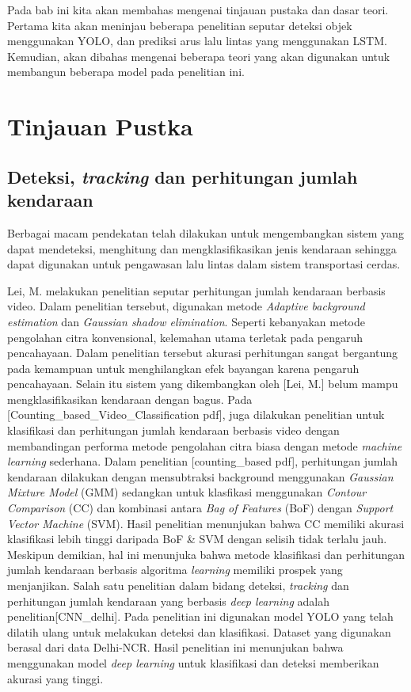 \documentclass[../thesis.tex]{subfiles}
\begin{document}
   

Pada bab ini kita akan membahas mengenai tinjauan pustaka dan dasar teori. Pertama kita akan meninjau beberapa penelitian seputar deteksi objek menggunakan YOLO, dan prediksi arus lalu lintas yang menggunakan LSTM.
Kemudian, akan dibahas mengenai beberapa teori yang akan digunakan untuk membangun beberapa model pada penelitian ini.

\section{Tinjauan Pustka}
\subsection{Deteksi, \textit{tracking} dan perhitungan jumlah kendaraan}
Berbagai macam pendekatan telah dilakukan untuk mengembangkan sistem yang dapat mendeteksi, menghitung dan mengklasifikasikan jenis kendaraan sehingga dapat digunakan untuk pengawasan lalu lintas dalam sistem transportasi cerdas.

Lei, M. melakukan penelitian seputar perhitungan jumlah kendaraan berbasis video. Dalam penelitian tersebut, digunakan metode \textit{Adaptive background estimation} dan \textit{Gaussian shadow elimination}. Seperti kebanyakan metode pengolahan citra konvensional, kelemahan utama terletak pada pengaruh pencahayaan. Dalam penelitian tersebut akurasi perhitungan
sangat bergantung pada kemampuan untuk menghilangkan efek bayangan karena pengaruh pencahayaan. Selain itu sistem yang dikembangkan oleh [Lei, M.] belum mampu mengklasifikasikan kendaraan dengan bagus.
Pada [Counting_based_Video_Classification pdf], juga dilakukan penelitian untuk klasifikasi dan perhitungan jumlah kendaraan berbasis video dengan membandingan performa metode pengolahan citra biasa dengan metode \textit{machine learning} sederhana. Dalam penelitian [counting_based pdf], perhitungan jumlah kendaraan dilakukan dengan mensubtraksi background menggunakan \textit{Gaussian Mixture Model} (GMM) sedangkan untuk klasfikasi menggunakan \textit{Contour Comparison} (CC) dan kombinasi antara \textit{Bag of Features}
(BoF) dengan \textit{Support Vector Machine} (SVM). Hasil penelitian menunjukan bahwa CC memiliki akurasi klasifikasi lebih tinggi daripada BoF \& SVM dengan selisih tidak terlalu jauh. 
Meskipun demikian, hal ini menunjuka bahwa metode klasifikasi dan perhitungan jumlah kendaraan berbasis algoritma \textit{learning} memiliki prospek yang menjanjikan.
Salah satu penelitian dalam bidang deteksi, \textit{tracking} dan perhitungan jumlah kendaraan yang berbasis \textit{deep learning} adalah penelitian[CNN_delhi]. Pada penelitian ini digunakan model YOLO yang telah dilatih ulang untuk melakukan deteksi dan klasifikasi. Dataset yang digunakan berasal dari data Delhi-NCR. Hasil penelitian ini menunjukan bahwa menggunakan model \textit{deep learning} untuk klasifikasi dan deteksi memberikan akurasi yang tinggi.  
\end{document}
